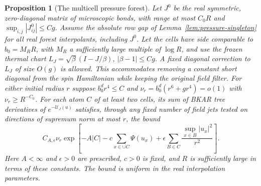 \documentclass[11pt]{article}
\newtheorem{proposition}[theorem]{Proposition}
\theoremstyle{definition}
\begin{document}
\begin{proposition}[The multicell pressure forest]\label{prop:pressure-trees}
Let \(J^0\) be the real symmetric, zero-diagonal matrix of microscopic
bonds, with range at most \(C_0R\) and \(\sup_{i,j}|J^0_{ij}|\le Cg\).
Assume the absolute row gap of Lemma~\ref{lem:pressure-singleton}
for all real forest interpolants, including \(J^0\). Let the cells have side
comparable to \(b_0=M_RR\), with \(M_R\) a sufficiently large multiple
of \(\log R\), and use the frozen thermal chart
\(L_J=\sqrt\beta(I-J/\beta)\), \(|\beta-1|\le Cg\).
A fixed diagonal correction to \(L_J\) of size \(O(g)\) is
allowed. This accommodates removing a constant short diagonal
from the spin Hamiltonian while keeping the original field filter.
For either initial radius \(r\) suppose \(b_0^d r^4\le C\) and
\(\nu_r=b_0^d(r^6+g r^4)=o(1)\) with \(\nu_r\ge R^{-C_0}\).
For each atom \(C\) of at least two cells, its sum of BKAR tree
derivatives of \(e^{-\mathcal U_J(u)}\) satisfies, through any fixed
number of field jets tested on directions of supremum norm at most \(r\),
the bound
\begin{equation}
 C_{A,\epsilon}\nu_r
  \exp\left[-A|C|-c\sum_{x\in \cup C}\Psi(u_x)
       +\epsilon\sum_{B\in C}\frac{\sup_{x\in B}|u_x|^2}{r^2}\right].
\end{equation}
Here \(A<\infty\) and \(\epsilon>0\) are prescribed, \(c>0\) is
fixed, and \(R\) is sufficiently large in terms of these constants.
The bound is uniform in the real interpolation parameters.
\end{proposition}
\end{document}
